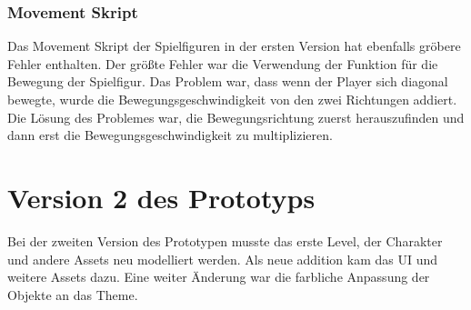\subsubsection{Movement Skript}
Das Movement Skript der Spielfiguren in der ersten Version hat ebenfalls gröbere Fehler enthalten. Der größte Fehler war die Verwendung der Funktion für die Bewegung der Spielfigur. Das Problem war, dass wenn der Player sich diagonal bewegte, wurde die Bewegungsgeschwindigkeit von den zwei Richtungen addiert. Die Lösung des Problemes war, die Bewegungsrichtung zuerst herauszufinden und dann erst die Bewegungsgeschwindigkeit zu multiplizieren.

\pagebreak

\section{Version 2 des Prototyps}

Bei der zweiten Version des Prototypen musste das erste Level, der Charakter und andere Assets neu modelliert werden. Als neue addition kam das UI und weitere Assets dazu. Eine weiter Änderung war die farbliche Anpassung der Objekte an das Theme. 

